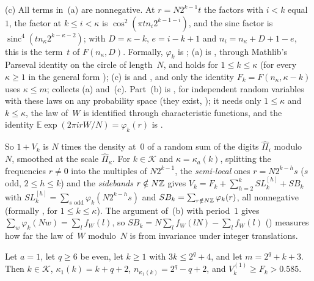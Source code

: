 \begin{outline}
(c) All terms in~(a) are nonnegative. At $r=N2^{k-1}t$ the factors with $i<k$ equal~$1$, the factor at $k\le i<\kappa$ is
$\cos^2(\pi tn_i2^{k-1-i})$, and the sinc factor is $\operatorname{sinc}^4(tn_\kappa2^{k-\kappa-2})$; with $D=\kappa-k$,
$e=i-k+1$ and $n_i=n_\kappa+D+1-e$, this is the term~$t$ of $F(n_\kappa,D)$.
Formally, $\varphi_k$ is ; (a) is , through
Mathlib's Parseval identity on the circle of length~$N$, and holds for $1\le k\le\kappa$ (for every $\kappa\ge1$ in the
general form ); (c) is  and
, and only the identity $F_k=F(n_\kappa,\kappa-k)$ uses $\kappa\le m$;
 collects (a) and~(c). Part~(b) is , for independent random
variables with these laws on any probability space (they exist, ); it needs only
$1\le\kappa$ and $k\le\kappa$, the law of~$W$ is identified through characteristic functions, and the identity
$\mathbb E\exp(2\pi irW/N)=\varphi_k(r)$ is .
\end{outline}

So $1+V_k$ is $N$ times the density at~$0$ of a random sum of the digits $\hat\Pi_i$ modulo~$N$, smoothed at the scale
$\hat\Pi_\kappa$. For $k\in\mathcal K$ and $\kappa=\kappa_a(k)$, splitting the frequencies $r\ne0$ into the multiples of
$N2^{k-1}$, the \emph{semi-local} ones $r=N2^{k-h}s$ ($s$ odd, $2\le h\le k$) and the \emph{sidebands} $r\notin N\mathbb{Z}$ gives
$V_k=F_k+\sum_{h=2}^kSL^{[h]}_k+SB_k$ with $SL^{[h]}_k=\sum_{s\text{ odd}}\varphi_k(N2^{k-h}s)$ and
$SB_k=\sum_{r\notin N\mathbb{Z}}\varphi_k(r)$, all nonnegative (formally , for $1\le k\le\kappa$).
The argument of~(b) with period~$1$ gives $\sum_w\varphi_k(Nw)=\sum_lf_W(l)$, so $SB_k=N\sum_lf_W(lN)-\sum_lf_W(l)$
() measures how far the law of~$W$ modulo~$N$ is from invariance under integer
translations.

\begin{proposition}\label{prop:S-resonance}
Let $a=1$, let $q\ge6$ be even, let $k\ge1$ with $3k\le2^q+4$, and let $m=2^q+k+3$. Then $k\in\mathcal K$,
$\kappa_1(k)=k+q+2$, $n_{\kappa_1(k)}=2^q-q+2$, and $V^{(1)}_k\ge F_k>0.585$.
\end{proposition}

